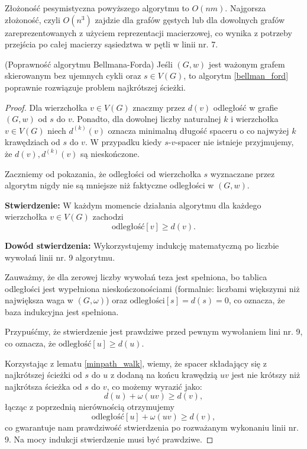 Złożoność pesymistyczna powyższego algorytmu to $O(nm)$.
Najgorsza złożoność, czyli $O(n^3)$ zajdzie dla grafów 
gęstych lub dla dowolnych grafów
zareprezentowanych z użyciem reprezentacji macierzowej, co wynika
z potrzeby przejścia po całej macierzy sąsiedztwa w pętli w linii nr. 7.

\begin{theorem}
	(Poprawność algorytmu Bellmana-Forda) Jeśli
	$(G, w)$ jest ważonym grafem skierowanym
	bez ujemnych cykli oraz
	$s \in V(G)$, to algorytm \ref{bellman_ford}
	poprawnie rozwiązuje problem najkrótszej ścieżki.
	\begin{proof}
		Dla wierzchołka $v \in V (G)$ znaczmy 
		przez $d(v)$ odległość w grafie
		$(G, w)$ od $s$ do $v$. 
		Ponadto, dla dowolnej liczby
		naturalnej $k$ i 
		wierzchołka $v \in V(G)$ niech 
		$d^{(k)}(v)$ oznacza minimalną długość 
		spaceru o co najwyżej $k$ krawędziach
		od $s$ do $v$. W przypadku kiedy $s$-$v$-spacer
		nie istnieje przyjmujemy, że $d(v), d^{(k)}(v)$
		są nieskończone.
		
		Zaczniemy od pokazania, że odległości 
		od wierzchołka $s$ 
		wyznaczane przez algorytm nigdy nie są mniejsze niż
		faktyczne odległości w $(G, w)$.
		
		\textbf{Stwierdzenie:} W każdym momencie
		działania algorytmu dla każdego wierzchołka
		$v \in V(G)$ zachodzi 
		\[\text{odległość}[v] \geq d(v).\]
		
		\textbf{Dowód stwierdzenia:} Wykorzystujemy
		indukcję matematyczną po liczbie wywołań linii nr. 9 algorytmu. 
		
		Zauważmy, że dla zerowej liczby wywołań teza jest spełniona,
		bo tablica odległości jest wypełniona nieskończonościami 
		(formalnie: liczbami większymi niż największa waga w $(G, \omega)$)
		oraz $\text{odległości}[s]=d(s)=0$, co oznacza, że
		baza indukcyjna jest spełniona.
		
		Przypuśćmy, że stwierdzenie jest prawdziwe przed pewnym
		wywołaniem lini nr. 9, co oznacza, że 
		$\text{odległość}[u] \geq d(u)$. 
		
		Korzystając z lematu 
		\ref{minpath_walk}, wiemy, że spacer składający 
		się z najkrótszej ścieżki od $s$ do $u$ z dodaną 
		na końcu krawędzią $uv$ jest nie krótszy niż 
		najkrótsza ścieżka od $s$ do $v$, co możemy 
		wyrazić jako:
		\[d(u) + \omega(uv) \geq d(v),\]
		łącząc z poprzednią nierównością otrzymujemy
		\[\text{odległość}[u] + \omega(uv) \geq d(v),\]
		co gwarantuje nam prawdziwość stwierdzenia po 
		rozważanym wykonaniu linii nr. 9. Na mocy indukcji stwierdzenie musi być prawdziwe.
		

\end{proof}
\end{theorem}
